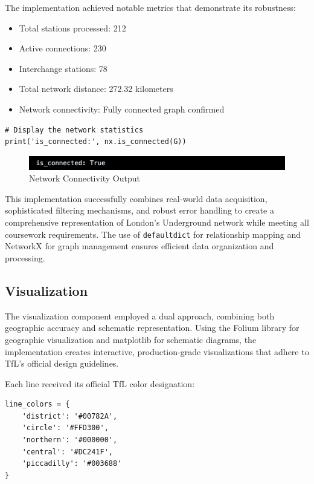 \documentclass{article}
\begin{document}
The implementation achieved notable metrics that demonstrate its robustness:

\begin{itemize}
    \item Total stations processed: 212
    \item Active connections: 230
    \item Interchange stations: 78
    \item Total network distance: 272.32 kilometers
    \item Network connectivity: Fully connected graph confirmed
\end{itemize}

\begin{lstlisting}[style=RStyle, caption={Network Statistics Display}]
# Display the network statistics
print('is_connected:', nx.is_connected(G))
\end{lstlisting}

\begin{figure}[H]
    \centering
    \includegraphics[width=\linewidth]{Images/NetworkConnectivity.png}
    \caption{Network Connectivity Output}
    \label{fig:network_connectivity}
\end{figure}

This implementation successfully combines real-world data acquisition, sophisticated filtering mechanisms, and robust error handling to create a comprehensive representation of London's Underground network while meeting all coursework requirements. The use of \texttt{defaultdict} for relationship mapping and NetworkX for graph management ensures efficient data organization and processing.

\subsection{Visualization}

The visualization component employed a dual approach, combining both geographic accuracy and schematic representation. Using the Folium library for geographic visualization and matplotlib for schematic diagrams, the implementation creates interactive, production-grade visualizations that adhere to TfL's official design guidelines.

Each line received its official TfL color designation:

\begin{lstlisting}[style=PythonStyle, caption={TfL Line Color Designations}]
line_colors = {
    'district': '#00782A',
    'circle': '#FFD300',
    'northern': '#000000',
    'central': '#DC241F',
    'piccadilly': '#003688'
}
\end{lstlisting}
\end{document}
